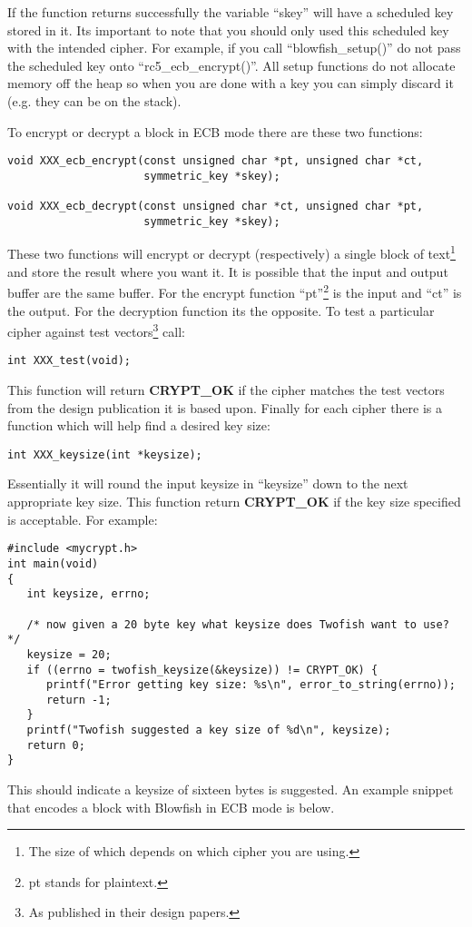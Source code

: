 \documentclass{book}
\begin{document}
If the function returns successfully the variable ``skey'' will have a scheduled key stored in it.  Its important to note
that you should only used this scheduled key with the intended cipher.  For example, if you call 
``blowfish\_setup()'' do not pass the scheduled key onto ``rc5\_ecb\_encrypt()''.  All setup functions do not allocate 
memory off the heap so when you are done with a key you can simply discard it (e.g. they can be on the stack).

To encrypt or decrypt a block in ECB mode there are these two functions:
 
\begin{verbatim}
void XXX_ecb_encrypt(const unsigned char *pt, unsigned char *ct,
                     symmetric_key *skey);

void XXX_ecb_decrypt(const unsigned char *ct, unsigned char *pt,
                     symmetric_key *skey);
\end{verbatim}
These two functions will encrypt or decrypt (respectively) a single block of text\footnote{The size of which depends on
which cipher you are using.} and store the result where you want it.  It is possible that the input and output buffer are 
the same buffer.  For the encrypt function ``pt''\footnote{pt stands for plaintext.} is the input and ``ct'' is the output.
For the decryption function its the opposite.  To test a particular cipher against test vectors\footnote{As published in their design papers.} call: 
\begin{verbatim}
int XXX_test(void);
\end{verbatim}
This function will return {\bf CRYPT\_OK} if the cipher matches the test vectors from the design publication it is 
based upon.  Finally for each cipher there is a function which will help find a desired key size:
\begin{verbatim}
int XXX_keysize(int *keysize);
\end{verbatim}
Essentially it will round the input keysize in ``keysize'' down to the next appropriate key size.  This function
return {\bf CRYPT\_OK} if the key size specified is acceptable.  For example:
\begin{small}
\begin{verbatim}
#include <mycrypt.h>
int main(void)
{
   int keysize, errno;

   /* now given a 20 byte key what keysize does Twofish want to use? */
   keysize = 20;
   if ((errno = twofish_keysize(&keysize)) != CRYPT_OK) {
      printf("Error getting key size: %s\n", error_to_string(errno));
      return -1;
   }
   printf("Twofish suggested a key size of %d\n", keysize);
   return 0;
}
\end{verbatim}
\end{small}
This should indicate a keysize of sixteen bytes is suggested.  An example snippet that encodes a block with 
Blowfish in ECB mode is below.
\end{document}
